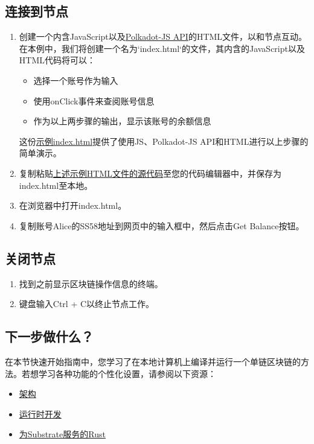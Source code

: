 \subsection{连接到节点}

\begin{enumerate}
  \item 创建一个内含JavaScript以及\href{https://polkadot.js.org/docs/}{Polkadot-JS API}的HTML文件，以和节点互动。
  在本例中，我们将创建一个名为`index.html`的文件，其内含的JavaScript以及HTML代码将可以：
        \begin{itemize}
          \item 选择一个账号作为输入
          \item 使用onClick事件来查阅账号信息
          \item 作为以上两步骤的输出，显示该账号的余额信息
        \end{itemize}

        这份\href{https://docs.substrate.io/assets/quickstart/}{示例index.html}提供了使用JS、Polkadot-JS
        API和HTML进行以上步骤的简单演示。
  \item 复制粘贴\href{https://github.com/substrate-developer-hub/substrate-docs/blob/main/static/assets/quickstart/index.html}{上述示例HTML文件的源代码}至您的代码编辑器中，并保存为index.html至本地。
  \item 在浏览器中打开index.html。
  \item 复制账号Alice的SS58地址到网页中的输入框中，然后点击Get Balance按钮。
\end{enumerate}

\subsection{关闭节点}
\begin{enumerate}
  \item 找到之前显示区块链操作信息的终端。
  \item 键盘输入Ctrl + C以终止节点工作。
\end{enumerate}

\subsection{下一步做什么？}

在本节快速开始指南中，您学习了在本地计算机上编译并运行一个单链区块链的方法。若想学习各种功能的个性化设置，请参阅以下资源：

\begin{itemize}
  \item \href{https://docs.substrate.io/fundamentals/architecture/}{架构}
  \item \href{https://docs.substrate.io/fundamentals/runtime-development/}{运行时开发}
  \item \href{https://docs.substrate.io/fundamentals/rust-basics/}{为Substrate服务的Rust}
\end{itemize}

